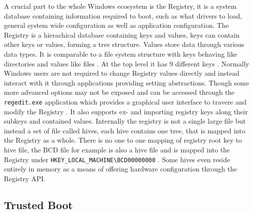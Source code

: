 A crucial part to the whole Windows ecosystem is the Registry, it is a system database containing information required to boot, such as what drivers to load, general system wide configuration as well as application configuration.
\cite[1. Registry]{windows-internals-7-part1}
The Registry is a hierachical database containing keys and values, keys can contain other keys or values, forming a tree structure. Values store data through various data types.
It is comparable to a file system structure with keys behaving like directories and values like files \cite[10. The registry - Registry data types]{windows-internals-7-part2}. At the top level it has 9 different keys \cite[10. The registry - Registry logical structure]{windows-internals-7-part2}. Normally Windows users are not required to change Registry values directly and instead interact with it through applications providing setting abstractions. Though some more advanced options may not be exposed and can be accessed through the \lstinline{regedit.exe} application which provides a graphical user interface to travere and modify the Registry \cite[10. The registry - Viewing and changing the registry]{windows-internals-7-part2}. It also supports ex- and importing registry keys along their subkeys and contained values. Internally the registry is not a single large file but instead a set of file called hives, each hive contains one tree, that is mapped into the Registry as a whole. There is no one to one mapping of registry root key to hive file, the \ac{BCD} file for example is also a hive file and is mapped into the Registry under \lstinline{HKEY_LOCAL_MACHINE\BCD00000000} \cite[10. The registry - Registry logical structure]{windows-internals-7-part2}. Some hives even reside entirely in memory as a means of offering hardware configuration through the Registry \ac{API}.



\subsection{Trusted Boot}
